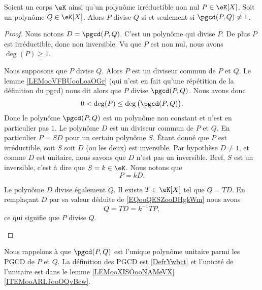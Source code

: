 \begin{lemma}       \label{LEMooVWBPooQITlUL}
	Soient un corps \( \eK\) ainsi qu'un polynôme irréductible non nul \( P\in \eK[X]\). Soit un polynôme \( Q\in \eK[X]\). Alors \( P\) divise \( Q\) si et seulement si \( \pgcd(P,Q)\neq 1\).
\end{lemma}

\begin{proof}
	Nous notons \( D=\pgcd(P,Q)\). C'est un polynôme qui divise \( P\). De plus \( P\) est irréductible, donc non inversible. Vu que \( P\) est non nul, nous avons \( \deg(P)\geq 1\).
	\begin{subproof}
		\spitem[$ \Rightarrow$]
		Nous supposons que \( P\) divise \( Q\). Alors \( P\) est un diviseur commun de \( P\) et \( Q\). Le lemme \ref{LEMooVFBUooLoaOGr} (qui n'est en fait qu'une répétition de la définition du pgcd) nous dit alors que \( P\) divise \( \pgcd(P,Q)\). Nous avons donc
		\begin{equation}
			0<\deg(P)\leq \deg\big( \pgcd(P,Q) \big).
		\end{equation}
		Donc le polynôme \( \pgcd(P,Q)\) est un polynôme non constant et n'est en particulier pas \( 1\).
		\spitem[$ \Leftarrow$]
		Le polynôme \( D\) est un diviseur commun de \( P\) et \( Q\). En particulier \( P=SD\) pour un certain polynôme \( S\). Étant donné que \( P\) est irréductible, soit \( S\) soit \( D\) (ou les deux) est inversible. Par hypothèse \( D\neq 1\), et comme \( D\) est unitaire, nous savons que \( D\) n'est pas un inversible. Bref, \( S\) est un inversible, c'est à dire que \( S=k\in \eK\). Nous notons que
		\begin{equation}        \label{EQooQESZooDHgkWm}
			P=kD.
		\end{equation}

		Le polynôme \( D\) divise également \( Q\). Il existe \( T\in \eK[X]\) tel que \( Q=TD\). En remplaçant \( D\) par sa valeur déduite de \eqref{EQooQESZooDHgkWm} nous avons
		\begin{equation}
			Q=TD=k^{-1} TP,
		\end{equation}
		ce qui signifie que \( P\) divise \( Q\).
	\end{subproof}
\end{proof}

Nous rappelons à  que \( \pgcd(P,Q)\) est l'unique polynôme unitaire parmi les PGCD de \( P\) et \( Q\). La définition des PGCD est \ref{DefrYwbct} et l'unicité de l'unitaire est dans le lemme \ref{LEMooXISOooNAMeVX}\ref{ITEMooARLJooOQvBcw}.

